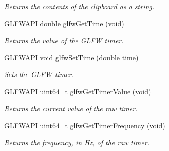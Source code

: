 \begin{DoxyCompactItemize}
\begin{DoxyCompactList}\small\item\em Returns the contents of the clipboard as a string. \end{DoxyCompactList}\item 
\mbox{\hyperlink{glfw3_8h_a56da5036b2cc259351ae22fd6439bb47}{G\+L\+F\+W\+A\+PI}} double \mbox{\hyperlink{group__input_ga03d4a1039b8662c71eeb40beea8cb622}{glfw\+Get\+Time}} (\mbox{\hyperlink{glad_8h_a950fc91edb4504f62f1c577bf4727c29}{void}})
\begin{DoxyCompactList}\small\item\em Returns the value of the G\+L\+FW timer. \end{DoxyCompactList}\item 
\mbox{\hyperlink{glfw3_8h_a56da5036b2cc259351ae22fd6439bb47}{G\+L\+F\+W\+A\+PI}} \mbox{\hyperlink{glad_8h_a950fc91edb4504f62f1c577bf4727c29}{void}} \mbox{\hyperlink{group__input_ga94360a3628a09f32708f83cc3fa48590}{glfw\+Set\+Time}} (double time)
\begin{DoxyCompactList}\small\item\em Sets the G\+L\+FW timer. \end{DoxyCompactList}\item 
\mbox{\hyperlink{glfw3_8h_a56da5036b2cc259351ae22fd6439bb47}{G\+L\+F\+W\+A\+PI}} uint64\+\_\+t \mbox{\hyperlink{group__input_gaa00c3e32227eb70b3968fca0bfe4ae26}{glfw\+Get\+Timer\+Value}} (\mbox{\hyperlink{glad_8h_a950fc91edb4504f62f1c577bf4727c29}{void}})
\begin{DoxyCompactList}\small\item\em Returns the current value of the raw timer. \end{DoxyCompactList}\item 
\mbox{\hyperlink{glfw3_8h_a56da5036b2cc259351ae22fd6439bb47}{G\+L\+F\+W\+A\+PI}} uint64\+\_\+t \mbox{\hyperlink{group__input_gaa92d10b10013372778efbf6367714371}{glfw\+Get\+Timer\+Frequency}} (\mbox{\hyperlink{glad_8h_a950fc91edb4504f62f1c577bf4727c29}{void}})
\begin{DoxyCompactList}\small\item\em Returns the frequency, in Hz, of the raw timer. \end{DoxyCompactList}\end{DoxyCompactItemize}
